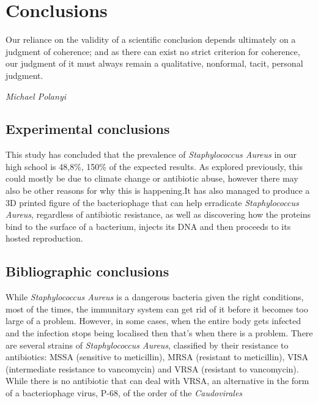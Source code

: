 \chapter{Conclusions}
\epigraph{Our reliance on the validity of a scientific conclusion depends ultimately on a judgment of coherence; and as there can exist no strict criterion for coherence, our judgment of it must always remain a qualitative, nonformal, tacit, personal judgment.}{\textit{Michael Polanyi}}
\section{Experimental conclusions}
This study has concluded that the prevalence of \emph{Staphylococcus Aureus} in our high school is 48,8\%, 150\% of the expected results. As explored previously, this could mostly be due to climate change or antibiotic abuse, however there may also be other reasons for why this is happening.\newline It has also managed to produce a 3D printed figure of the bacteriophage that can help erradicate \emph{Staphylococcus Aureus}, regardless of antibiotic resistance, as well as discovering how the proteins bind to the surface of a bacterium, injects its DNA and then proceeds to its hosted reproduction.
\section{Bibliographic conclusions}
While \emph{Staphylococcus Aureus} is a dangerous bacteria given the right conditions, most of the times, the immunitary system can get rid of it before it becomes too large of a problem. However, in some cases, when the entire body gets infected and the infection stops being localised then that's when there is a problem. There are several strains of \emph{Staphylococcus Aureus}, classified by their resistance to antibiotics: MSSA (sensitive to meticillin), MRSA (resistant to meticillin), VISA (intermediate resistance to vancomycin) and VRSA (resistant to vancomycin). While there is no antibiotic that can deal with VRSA, an alternative in the form of a bacteriophage virus, P-68, of the order of the \emph{Caudovirales}
